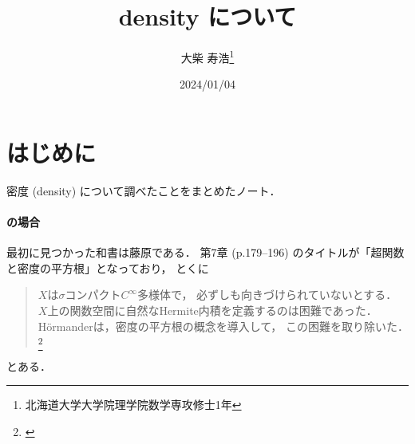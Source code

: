 





\def\inner<#1>{\langle #1 \rangle}
\def\ind<#1>{\mathop{\text{``}\hspace{-0.7pt}#1\limits\hspace{-1.5pt}\text{''}}}









\title{density について}
\author{大柴 寿浩\thanks{北海道大学大学院理学院数学専攻修士1年
}}
\date{2024/01/04}

\maketitle

\section*{はじめに}
密度 (density) について調べたことをまとめたノート．

\paragraph{\cite{F77}の場合}
最初に見つかった和書は藤原\cite{F77}である．
第7章 (p.179--196) のタイトルが「超関数と密度の平方根」となっており，
とくに
\begin{quotation}
    \(X\)は\(\sigma\)コンパクト\(C^\infty\)多様体で，
    必ずしも向きづけられていないとする．
    \(X\)上の関数空間に自然なHermite内積を定義するのは困難であった．
    H\"ormanderは，密度の平方根の概念を導入して，
    この困難を取り除いた．\footnote{\cite[p.183]{F77}}
\end{quotation}
とある．

